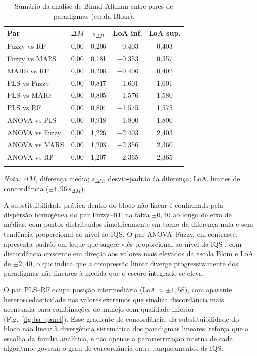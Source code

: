 \documentclass[pdflatex,sn-basic]{sn-jnl}%
\begin{document}
\begin{table}[ht]
\caption{Sumário da análise de Bland--Altman entre pares de paradigmas (escala Blom).}\label{tab:blandaltman}
\begin{tabular*}{\textwidth}{@{\extracolsep\fill}lcccc}
\toprule
Par & $\overline{\Delta M}$ & $s_{\Delta M}$ & LoA inf. & LoA sup. \\
\midrule
Fuzzy vs RF    & 0,00 & 0,206 & $-$0,403 & 0,403 \\
Fuzzy vs MARS  & 0,00 & 0,181 & $-$0,353 & 0,357 \\
MARS vs RF     & 0,00 & 0,206 & $-$0,406 & 0,402 \\
PLS vs Fuzzy   & 0,00 & 0,817 & $-$1,601 & 1,601 \\
PLS vs MARS    & 0,00 & 0,805 & $-$1,576 & 1,580 \\
PLS vs RF      & 0,00 & 0,804 & $-$1,575 & 1,575 \\
ANOVA vs PLS   & 0,00 & 0,918 & $-$1,800 & 1,800 \\
ANOVA vs Fuzzy & 0,00 & 1,226 & $-$2,403 & 2,403 \\
ANOVA vs MARS  & 0,00 & 1,203 & $-$2,356 & 2,360 \\
ANOVA vs RF    & 0,00 & 1,207 & $-$2,365 & 2,365 \\
\botrule
\end{tabular*}
\smallskip\noindent\textit{Nota:} $\overline{\Delta M}$, diferença média; $s_{\Delta M}$, desvio-padrão da diferença; LoA, limites de concordância ($\pm 1{,}96\,s_{\Delta M}$).
\end{table}

\clearpage

A substituibilidade prática dentro do bloco não linear é confirmada pela dispersão homogênea do par Fuzzy--RF na faixa $\pm 0{,}40$ ao longo do eixo de médias, com pontos distribuídos simetricamente em torno da diferença nula e sem tendência proporcional ao nível do IQS. O par ANOVA--Fuzzy, em contraste, apresenta padrão em leque que sugere viés proporcional ao nível do IQS \citep{Giavarina2015}, com discordância crescente em direção aos valores mais elevados da escala Blom e LoA de $\pm 2{,}40$, o que indica que a compressão linear diverge progressivamente dos paradigmas não lineares à medida que o escore integrado se eleva. 

O par PLS--RF ocupa posição intermediária (LoA\,$\approx \pm 1{,}58$), com aparente heteroscedasticidade nos valores extremos que sinaliza discordância mais acentuada para combinações de manejo com qualidade inferior (Fig.~\ref{fig:ba_panel}). Esse gradiente de concordância, da substituibilidade do bloco não linear à divergência sistemática dos paradigmas lineares, reforça que a escolha da família analítica, e não apenas a parametrização interna de cada algoritmo, governa o grau de concordância entre ranqueamentos de IQS.
\end{document}
